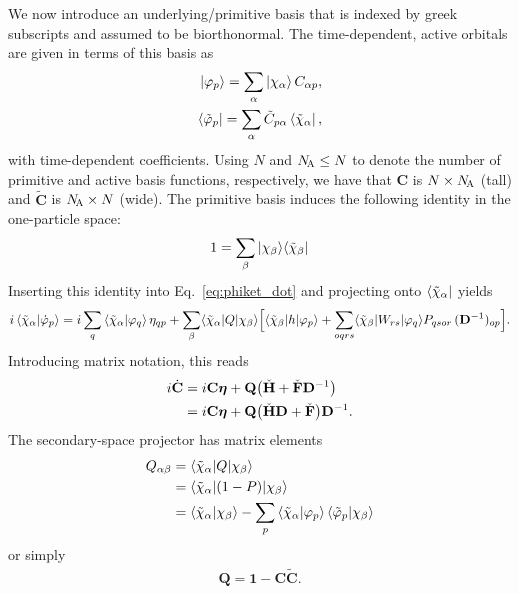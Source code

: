 \documentclass[aip,jcp,preprint,superscriptaddress,nofootinbib]{revtex4-1}
\begin{document}
We now introduce an underlying/primitive basis that is indexed by greek subscripts and assumed to be biorthonormal.
The time-dependent, active orbitals are given in terms of this basis as
\begin{align}
    \ket{\varphi_{p}} = \sum_{\alpha} \ket{\chi_{\alpha}} C_{\alpha p},         \label{eq:phi_ket_expansion} \\
    \bra{\tilde{\varphi}_{p}} = \sum_{\alpha} \tilde{C}_{p \alpha} \bra{\tilde{\chi}_{\alpha}}, \label{eq:phi_bra_expansion}
\end{align}
with time-dependent coefficients. 
Using $N$ and $N_{\!\textsc{A}} \leq N$ to denote the number of primitive and active
basis functions, respectively, we have that
$\mathbf{C}$         is $N \times N_{\!\textsc{A}}$ (tall) and 
$\tilde{\mathbf{C}}$ is $N_{\!\textsc{A}} \times N$ (wide).
The primitive basis induces the following identity in
the one-particle space:
\begin{align}
    1 = \sum_{\beta} \ket{\chi_{\beta}} \! \bra{\tilde{\chi}_{\beta}} 
\end{align}
Inserting this identity into Eq.~\eqref{eq:phiket_dot} and projecting onto $\bra{\tilde{\chi}_{\alpha}}$ yields
\begin{multline}
    i \braket{\tilde{\chi}_{\alpha} | \dot{\varphi}_{p}} 
    = i \sum_{q} \braket{\tilde{\chi}_{\alpha} | \varphi_{q}} \eta_{qp}
    + \sum_{\beta} \langle \tilde{\chi}_{\alpha} \vert Q \vert \chi_{\beta} \rangle \Big[
    \langle \tilde{\chi}_{\beta} \vert h \vert \varphi_{p} \rangle
    + \sum_{oqrs}  \langle \tilde{\chi}_{\beta} \vert W_{rs} \vert \varphi_{q} \rangle P_{qsor} \, (\mathbf{D}^{-1})_{op}
    \Big].
\end{multline}
Introducing matrix notation, this reads
\begin{align} \label{eq:C_dot}
    i \dot{\mathbf{C}} 
    &= i \mathbf{C} \bm{\eta} + 
    \mathbf{Q}  \big( \check{\mathbf{H}} + \check{\mathbf{F}} \mathbf{D}^{-1} \big) \nonumber\\
    &= i \mathbf{C} \bm{\eta} + 
    \mathbf{Q}  \big( \check{\mathbf{H}} \mathbf{D} + \check{\mathbf{F}} \big) \mathbf{D}^{-1} .
\end{align}
The secondary-space projector has matrix elements
\begin{align}
    Q_{\alpha \beta} 
    &= \langle \tilde{\chi}_{\alpha} \vert Q \vert \chi_{\beta} \rangle \nonumber\\
    &= \langle \tilde{\chi}_{\alpha} \vert (1 - P) \vert \chi_{\beta} \rangle \nonumber\\
    &= \braket{\tilde{\chi}_{\alpha} | \chi_{\beta}} - \sum_{p} \braket{\tilde{\chi}_{\alpha} | \varphi_{p}} \braket{\tilde{\varphi}_{p} | \chi_{\beta}}
\end{align}
or simply
\begin{align} \label{eq:Q_proj_matrix}
    \mathbf{Q} = \mathbf{1} - \mathbf{C} \tilde{\mathbf{C}}.
\end{align}
\end{document}
